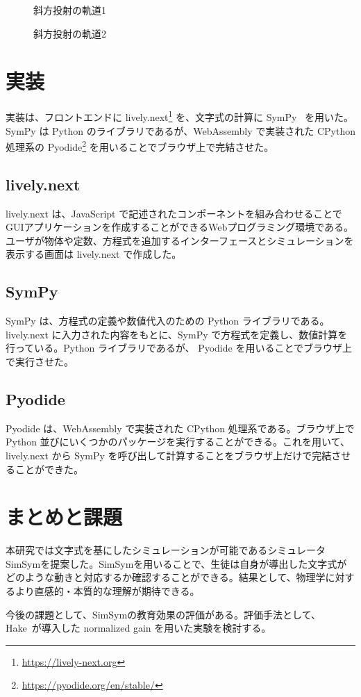 \documentclass[11pt, a4paper, oneside, twocolumn, dvipdfmx]{jsarticle}
\newcommand{\simname}{SimSym}
\begin{document}
\begin{figure}[htb]
\centering
\begin{minipage}{0.4\linewidth}
\centering
{}
\caption{斜方投射の軌道1} \label{correct}
\end{minipage}
\begin{minipage}{0.4\linewidth}
\centering
{}
\caption{斜方投射の軌道2} \label{wrong}
\end{minipage}
\end{figure}

\section{実装}
実装は、フロントエンドに lively.next\footnote{\url{https://lively-next.org}} を、文字式の計算に SymPy~\cite{meurer_sympy_2017} を用いた。SymPy は Python のライブラリであるが、WebAssembly で実装された CPython 処理系の Pyodide\footnote{\url{https://pyodide.org/en/stable/}} を用いることでブラウザ上で完結させた。

\subsection*{lively.next}
lively.next は、JavaScript で記述されたコンポーネントを組み合わせることでGUIアプリケーションを作成することができるWebプログラミング環境である。ユーザが物体や定数、方程式を追加するインターフェースとシミュレーションを表示する画面は lively.next で作成した。

\subsection*{SymPy}
SymPy は、方程式の定義や数値代入のための Python ライブラリである。lively.next に入力された内容をもとに、SymPy で方程式を定義し、数値計算を行っている。Python ライブラリであるが、 Pyodide を用いることでブラウザ上で実行させた。

\subsection{Pyodide}
Pyodide は、WebAssembly で実装された CPython 処理系である。ブラウザ上で Python 並びにいくつかのパッケージを実行することができる。これを用いて、lively.next から SymPy を呼び出して計算することをブラウザ上だけで完結させることができた。

\section{まとめと課題}
本研究では文字式を基にしたシミュレーションが可能であるシミュレータ \simname を提案した。\simname を用いることで、生徒は自身が導出した文字式がどのような動きと対応するか確認することができる。結果として、物理学に対するより直感的・本質的な理解が期待できる。

今後の課題として、\simname の教育効果の評価がある。評価手法として、Hake~\cite{hake_1998}が導入した normalized gain を用いた実験を検討する。



\end{document}
